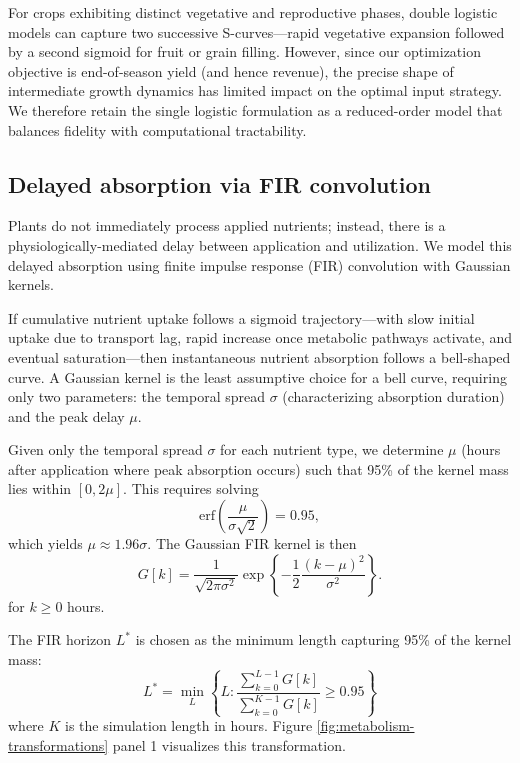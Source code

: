 \documentclass[pdflatex,sn-mathphys-num]{sn-jnl}
\newcommand{\df}[2]{\displaystyle\frac{#1}{#2}}
\begin{document}
For crops exhibiting distinct vegetative and reproductive phases, double logistic models can capture two successive S-curves---rapid vegetative expansion followed by a second sigmoid for fruit or grain filling. However, since our optimization objective is end-of-season yield (and hence revenue), the precise shape of intermediate growth dynamics has limited impact on the optimal input strategy. We therefore retain the single logistic formulation as a reduced-order model that balances fidelity with computational tractability.

\subsection{Delayed absorption via FIR convolution}\label{subsec:fir-conv}

Plants do not immediately process applied nutrients; instead, there is a physiologically-mediated delay between application and utilization. We model this delayed absorption using finite impulse response (FIR) convolution with Gaussian kernels.

If cumulative nutrient uptake follows a sigmoid trajectory---with slow initial uptake due to transport lag, rapid increase once metabolic pathways activate, and eventual saturation---then instantaneous nutrient absorption follows a bell-shaped curve. A Gaussian kernel is the least assumptive choice for a bell curve, requiring only two parameters: the temporal spread $\sigma$ (characterizing absorption duration) and the peak delay $\mu$.

Given only the temporal spread $\sigma$ for each nutrient type, we determine $\mu$ (hours after application where peak absorption occurs) such that 95\% of the kernel mass lies within $[0, 2\mu]$. This requires solving
\begin{equation}
\text{erf}\left(\df{\mu}{\sigma\sqrt{2}}\right) = 0.95,
\label{eqn:erf}
\end{equation}
which yields $\mu \approx 1.96\sigma$. The Gaussian FIR kernel is then
\begin{equation}
G[k] = \df{1}{\sqrt{2\pi\sigma^{2}}} \exp\left\{ -\df{1}{2}\df{(k-\mu)^{2}}{\sigma^{2}} \right\}.
\label{eqn:gaussian-kernel}
\end{equation}
for $k\geq 0$ hours.

The FIR horizon $L^{*}$ is chosen as the minimum length capturing 95\% of the kernel mass:
\begin{equation}
L^{*} = \min_{L} \left\{ L : \df{\sum_{k=0}^{L-1} G[k]}{\sum_{k=0}^{K-1} G[k]} \geq 0.95 \right\}
\label{eqn:L-star}
\end{equation}
where $K$ is the simulation length in hours. Figure \ref{fig:metabolism-transformations} panel 1 visualizes this transformation.
\end{document}
